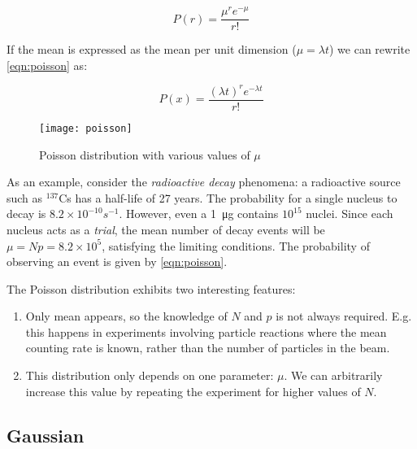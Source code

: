 \begin{equation}
	\label{eqn:poisson}
	P\left( r \right) = \frac{{\mu^{ r } e ^{-\mu} }}{{r!}}
\end{equation}

If the mean is expressed as the mean per unit dimension ($\mu = \lambda t$) we can rewrite \ref{eqn:poisson} as:

\begin{equation}
	P\left( x \right) = \frac{(\lambda t) ^r {e^{ - \lambda t}} }{{r!}}
\end{equation}

\begin{figure}
	\centerline{
		\texttt{[image: poisson]}}
	\caption{Poisson distribution with various values of $\mu$ \cite{leo2012techniques}}
\end{figure}


As an example, consider the \textit{radioactive decay} phenomena: a radioactive source such as $^{137}$Cs has a half-life of 27 years. The probability for a single nucleus to decay is $8.2 \times 10^{-10}s^{-1}$. However, even a \SI{1}{\micro\gram} contains $10^{15}$ nuclei. Since each nucleus acts as a \textit{trial}, the mean number of decay events will be $\mu = N p = 8.2 \times 10^5$, satisfying the limiting conditions. The probability of observing an event is given by \ref{eqn:poisson}.

The Poisson distribution exhibits two interesting features:

\begin{enumerate}
	\item Only mean appears, so the knowledge of $N$ and $p$ is not always required. E.g. this happens in experiments involving particle reactions where the mean counting rate is known, rather than the number of particles in the beam.

	\item This distribution only depends on one parameter: $\mu$. We can arbitrarily increase this value by repeating the experiment for higher values of $N$.
\end{enumerate}

\subsection{Gaussian}
\label{eqn:gaussian}


